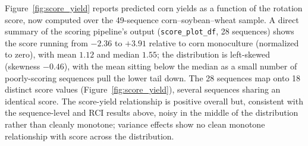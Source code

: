 \documentclass[12pt,letterpaper]{article}
\theoremstyle{remark}
\theoremstyle{remark}
\theoremstyle{plain}
\theoremstyle{definition}
\begin{document}
Figure~\ref{fig:score_yield} reports predicted corn yields as a function of the rotation score, now computed over the 49-sequence corn--soybean--wheat sample. A direct summary of the scoring pipeline's output (\texttt{score\_plot\_df}, 28 sequences) shows the score running from $-2.36$ to $+3.91$ relative to corn monoculture (normalized to zero), with mean $1.12$ and median $1.55$; the distribution is left-skewed (skewness $-0.46$), with the mean sitting below the median as a small number of poorly-scoring sequences pull the lower tail down. The 28 sequences map onto 18 distinct score values (Figure~\ref{fig:score_yield}), several sequences sharing an identical score. The score-yield relationship is positive overall but, consistent with the sequence-level and RCI results above, noisy in the middle of the distribution rather than cleanly monotone; variance effects show no clean monotone relationship with score across the distribution.
\end{document}
